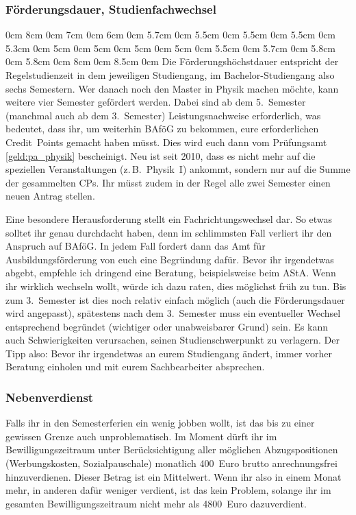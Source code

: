 \begin{multicols*}{2}
\subsubsection*{Förderungsdauer, Studienfachwechsel}
0cm \columnwidth
0cm \columnwidth
0cm \columnwidth
0cm \columnwidth
0cm 8cm
0cm 7cm
0cm 6cm
0cm 5.7cm
0cm 5.5cm
0cm 5.5cm
0cm 5.5cm
0cm 5.3cm
0cm 5cm
0cm 5cm
0cm 5cm
0cm 5cm
0cm 5.5cm
0cm 5.7cm
0cm 5.8cm
0cm 5.8cm
0cm 8cm
0cm 8.5cm
0cm \columnwidth
Die Förderungshöchstdauer entspricht der Regelstudienzeit in dem jeweiligen Studiengang, im Bachelor-Studiengang also sechs Semestern. Wer danach noch den Master in Physik machen möchte, kann weitere vier Semester gefördert werden. Dabei sind ab dem 5.\ Semester (manchmal auch ab dem 3.\ Semester) Leistungsnachweise erforderlich, was bedeutet, dass ihr, um weiterhin BAföG zu bekommen, eure erforderlichen Credit~Points gemacht haben müsst. Dies wird euch dann vom Prüfungsamt \cref{geld:pa_physik} bescheinigt. Neu ist seit 2010, dass es nicht mehr auf die speziellen Veranstaltungen (z.\,B.\ Physik~I) ankommt, sondern nur auf die Summe der gesammelten CPs. Ihr müsst zudem in der Regel alle zwei Semester einen neuen Antrag stellen.

Eine besondere Herausforderung stellt ein Fachrichtungswechsel dar. So etwas solltet ihr genau durchdacht haben, denn im schlimmsten Fall verliert ihr den Anspruch auf BAföG. In jedem Fall fordert dann das Amt für Ausbildungsförderung von euch eine Begründung dafür. Bevor ihr irgendetwas abgebt, empfehle ich dringend eine Beratung, beispielsweise beim AStA. Wenn ihr wirklich wechseln wollt, würde ich dazu raten, dies möglichst früh zu tun. Bis zum 3.\ Semester ist dies noch relativ einfach möglich (auch die Förderungsdauer wird angepasst), spätestens nach dem 3.\ Semester muss ein eventueller Wechsel entsprechend begründet (wichtiger oder unabweisbarer Grund) sein. Es kann auch Schwierigkeiten verursachen, seinen Studienschwerpunkt zu verlagern. Der Tipp also: Bevor ihr irgendetwas an eurem Studiengang ändert, immer vorher Beratung einholen und mit eurem Sachbearbeiter absprechen.

\subsubsection*{Nebenverdienst}
Falls ihr in den Semesterferien ein wenig jobben wollt, ist das bis zu einer gewissen Grenze auch unproblematisch. Im Moment dürft ihr im Bewilligungszeitraum unter Berücksichtigung aller möglichen Abzugspositionen (Werbungskosten, Sozialpauschale) monatlich 400~Euro brutto anrechnungsfrei hinzuverdienen. Dieser Betrag ist ein Mittelwert. Wenn ihr also in einem Monat mehr, in anderen dafür weniger verdient, ist das kein Problem, solange ihr im gesamten Bewilligungszeitraum nicht mehr als \num{4800}~Euro dazuverdient.


\end{multicols*}
